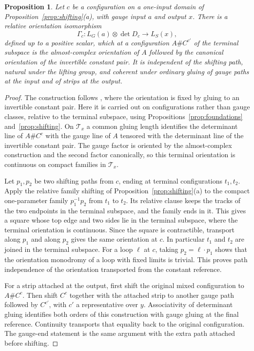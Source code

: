 \documentclass[11pt]{amsart}
\newtheorem{proposition}[theorem]{Proposition}
\theoremstyle{definition}
\theoremstyle{remark}
\theoremstyle{plain}
\numberwithin{equation}{section}
\begin{document}
\begin{proposition}\label{prop:transport}
Let $c$ be a configuration on a one-input domain of
Proposition~\ref{prop:shifting}(a), with gauge input $a$ and output
$x$. There is a relative orientation isomorphism
\begin{equation}\label{eq:Gamma}
 \Gamma_c:L_G(a)\otimes\det D_c\longrightarrow L_S(x),
\end{equation}
defined up to a positive scalar, which at a configuration $A\#C^{c'}$
of the terminal subspace is the almost-complex orientation of $A$
followed by the canonical orientation of the invertible constant pair.
It is independent of the shifting path, natural under the lifting
group, and coherent under ordinary gluing of gauge paths at the input
and of strips at the output.
\end{proposition}
\begin{proof}
The construction follows \cite[Section~4.7]{DFL}, where the orientation
is fixed by gluing to an invertible constant pair. Here it is carried
out on configurations rather than gauge classes, relative to the
terminal subspace, using Propositions~\ref{prop:foundations}
and~\ref{prop:shifting}. On $\mathcal T_x$ a common gluing
length identifies the determinant line of $A\#C^{c}$ with the gauge
line of $A$ tensored with the determinant line of the invertible
constant pair. The gauge factor is oriented by the almost-complex
construction and the second factor canonically, so this terminal
orientation is continuous on compact families in $\mathcal T_x$.

Let $p_1,p_2$ be two shifting paths from $c$, ending at terminal
configurations $t_1,t_2$. Apply the relative family shifting of
Proposition~\ref{prop:shifting}(a) to the compact one-parameter family
$p_1^{-1}p_2$ from $t_1$ to $t_2$. Its relative clause keeps the tracks
of the two endpoints in the terminal subspace, and the family ends in
it. This gives a square whose top edge and two sides lie in the
terminal subspace, where the terminal orientation is continuous. Since
the square is contractible, transport along $p_1$ and along $p_2$ gives
the same orientation at $c$. In particular $t_1$ and $t_2$ are joined in
the terminal subspace. For a loop $\ell$ at $c$, taking $p_2=\ell\cdot p_1$
shows that the orientation monodromy of a loop with fixed limits is
trivial. This proves path independence of the orientation transported
from the constant reference.

For a strip attached at the output, first shift the original
mixed configuration to $A\#C^{c}$. Then shift $C^{c}$ together
with the attached strip to another gauge path followed by
$C^{c'}$, with $c'$ a representative over $y$. Associativity of
determinant gluing identifies both orders of this construction with
gauge gluing at the final reference. Continuity transports that
equality back to the original configuration. The gauge-end statement
is the same argument with the extra path attached before shifting.


\end{proof}
\end{document}
